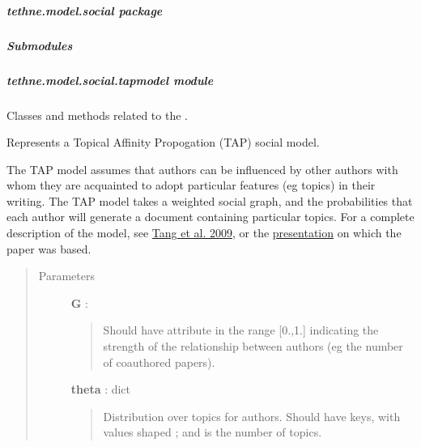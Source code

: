 \documentclass[letterpaper,10pt,english]{sphinxmanual}
\begin{document}
\subparagraph{tethne.model.social package}
\label{tethne.model.social:tethne-model-social-package}\label{tethne.model.social::doc}

\subparagraph{Submodules}
\label{tethne.model.social:submodules}

\subparagraph{tethne.model.social.tapmodel module}
\label{tethne.model.social.tapmodel:module-tethne.model.social.tapmodel}\label{tethne.model.social.tapmodel::doc}\label{tethne.model.social.tapmodel:tethne-model-social-tapmodel-module}
Classes and methods related to the {\hyperref[tethne.model.social.tapmodel:tethne.model.social.tapmodel.TAPModel]{}}.

\begin{fulllineitems}
\label{tethne.model.social.tapmodel:tethne.model.social.tapmodel.TAPModel}
Represents a Topical Affinity Propogation (TAP) social model.

The TAP model assumes that authors can be influenced by other authors with
whom they are acquainted to adopt particular features (eg topics) in their
writing. The TAP model takes a weighted social graph, and the probabilities
that each author will generate a document containing particular topics. For
a complete description of the model, see 
\href{https://wiki.engr.illinois.edu/download/attachments/186384416/KDD09\_Social\_Influence\_Analysis.pdf?version=1\&modificationDate=1255578264000}{Tang et al. 2009},
or the \href{http://videolectures.net/kdd09\_tang\_sia/}{presentation} on which
the paper was based.
\begin{quote}\begin{description}
\item[{Parameters}] \leavevmode
\textbf{G} : 
\begin{quote}

Should have  attribute in the range {[}0.,1.{]} indicating the
strength of the relationship between authors (eg the number of
coauthored papers).
\end{quote}

\textbf{theta} : dict
\begin{quote}

Distribution over topics for authors. Should have  keys, with 
values shaped ;  and  is the number of
topics.
\end{quote}


\end{description}
\end{quote}
\end{fulllineitems}
\end{document}
